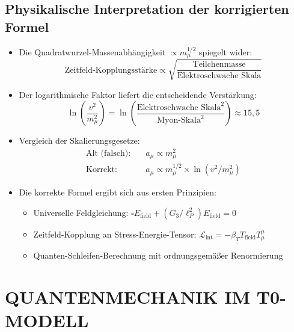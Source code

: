 \documentclass[12pt,a4paper]{article}
\begin{document}
\subsection{Physikalische Interpretation der korrigierten Formel}
\begin{itemize}
	\item Die Quadratwurzel-Massenabhängigkeit $\propto m_\mu^{1/2}$ spiegelt wider:
	\begin{equation}
		\text{Zeitfeld-Kopplungsstärke} \propto \sqrt{\frac{\text{Teilchenmasse}}{\text{Elektroschwache Skala}}}
	\end{equation}
	
	\item Der logarithmische Faktor liefert die entscheidende Verstärkung:
	\begin{equation}
		\ln\left(\frac{v^2}{m_\mu^2}\right) = \ln\left(\frac{\text{Elektroschwache Skala}^2}{\text{Myon-Skala}^2}\right) \approx 15,5
	\end{equation}
	
	\item Vergleich der Skalierungsgesetze:
	\begin{align}
		\text{Alt (falsch):} &\quad a_\mu \propto m_\mu^2 \\
		\text{Korrekt:} &\quad a_\mu \propto m_\mu^{1/2} \times \ln(v^2/m_\mu^2)
	\end{align}
	
	\item Die korrekte Formel ergibt sich aus ersten Prinzipien:
	\begin{itemize}
		\item Universelle Feldgleichung: $\square E_{\text{field}} + (G_3/\ell_P^2) E_{\text{field}} = 0$
		\item Zeitfeld-Kopplung an Stress-Energie-Tensor: $\mathcal{L}_{\text{int}} = -\beta_T T_{\text{field}} T^\mu_\mu$
		\item Quanten-Schleifen-Berechnung mit ordnungsgemäßer Renormierung
	\end{itemize}
\end{itemize}
	\section{QUANTENMECHANIK IM T0-MODELL}
	
\end{document}
